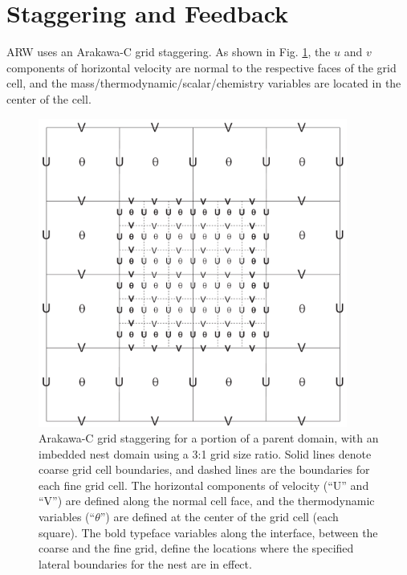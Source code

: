 \section{Staggering and Feedback}

ARW uses an Arakawa-C grid staggering.  As shown in Fig.
\ref{figure:cg_fg}, the $u$ and $v$ components 
of horizontal velocity are normal to the respective faces of the 
grid cell, and the mass/thermodynamic/scalar/chemistry variables are located 
in the center of the cell.   

%
%
\begin{figure}
  \centering
  \includegraphics[width=4in]{figures/cg_fg.pdf}
  \caption{\label{figure:cg_fg}
Arakawa-C grid staggering for a portion of a parent domain, 
with an imbedded nest domain using a 3:1 grid size ratio.  Solid lines
denote coarse grid cell boundaries, and dashed lines are the
boundaries for each fine grid cell.  The horizontal components of
velocity (``U'' and ``V'') are defined along the normal cell face, and
the thermodynamic variables (``$\theta$'') are defined at the center of
the grid cell (each square).  The bold typeface variables along the
interface, between the coarse and the fine grid, define the locations
where the specified lateral boundaries for the nest are in
effect.  } \end{figure}

